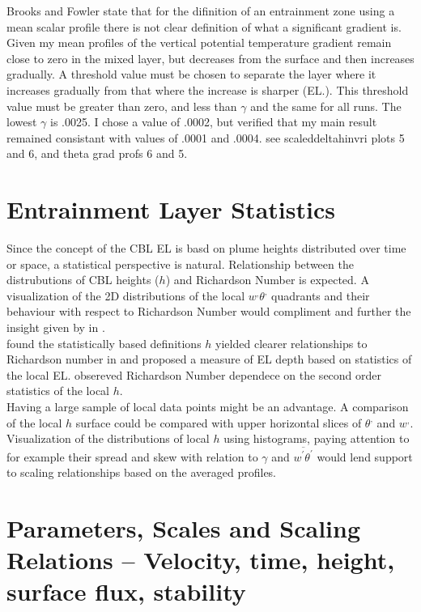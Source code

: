 Brooks and Fowler state that for the difinition of an entrainment zone using a mean scalar profile there
 is not clear definition of what a significant gradient is.  Given my mean profiles of the vertical potential
temperature gradient remain close to zero in the mixed layer, but decreases from the surface and then
increases gradually.  A threshold value must be chosen to separate the layer where it increases gradually
from that where the increase is sharper (EL.).  This threshold value must be greater than zero, and less
than $\gamma$ and the same for all runs.  The lowest $\gamma$ is .0025.  I chose a value of .0002, 
but verified that my main result  remained consistant with values of .0001 and .0004.
see scaleddeltahinvri plots 5 and 6, and theta grad profs 6 and 5.


\section{Entrainment Layer Statistics}
\label{sec:EntLayStat}
Since the concept of the \acs{CBL} \acs{EL} is basd on plume heights distributed over time
or space, a statistical perspective is natural.  Relationship between the distrubutions of 
\acs{CBL} heights ($h$) and Richardson Number is expected.  A visualization of
 the 2D distributions of the local $w^{,}\theta^{,}$ quadrants and their behaviour 
with respect to Richardson Number would compliment and further the insight given
by \citeauthor{SullMoengStev} in \cite{SullMoengStev}.\\

\citeauthor{BrooksFowler2} found the statistically based definitions $h$ yielded clearer 
relationships to Richardson number in \cite{BrooksFowler2} and proposed a measure of \acs{EL}
depth based on statistics of the local \acs{EL}.  \citeauthor{SullMoengStev} obsereved 
Richardson Number dependece on the second order statistics of the local $h$.\\

Having a large sample of local data points might be an advantage.  A comparison of the
local $h$  surface could be compared with upper horizontal slices of $\theta^{,}$ and 
$w^{,}$.  Visualization of the distributions of local $h$ using histograms, paying attention
to for example their spread and skew with relation to $\gamma$ and $\overline{w^{'}\theta^{'}}$
would lend support to scaling relationships based on the averaged profiles.\\

\section{Parameters, Scales and Scaling Relations -- Velocity, time, height, surface flux, stability}

